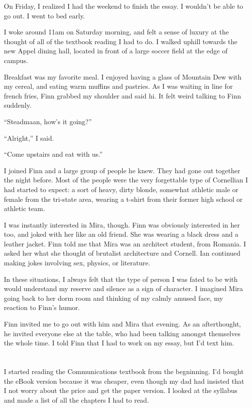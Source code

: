 On Friday, I realized I had the weekend to finish the essay.  I wouldn't be able
to go out. I went to bed early.

I woke around 11am on Saturday morning, and felt a sense of luxury at the
thought of all of the textbook reading I had to do.  I walked uphill towards the
new Appel dining hall, located in front of a large soccer field at the edge of
campus.

Breakfast was my favorite meal.  I enjoyed having a glass of Mountain Dew with
my cereal, and eating warm muffins and pastries.  As I was waiting in line for
french fries, Finn grabbed my shoulder and said hi.  It felt weird talking to
Finn suddenly.

``Steadmaan, how's it going?''

``Alright,'' I said.

``Come upstairs and eat with us.'' 

I joined Finn and a large group of people he knew.  They had gone out together
the night before.  Most of the people were the very forgettable type of
Cornellian I had started to expect: a sort of heavy, dirty blonde, somewhat
athletic male or female from the tri-state area, wearing a t-shirt from their
former high school or athletic team.

I was instantly interested in Mira, though.  Finn was obviously interested in
her too, and joked with her like an old friend.  She was wearing a black dress
and a leather jacket.  Finn told me that Mira was an architect student, from
Romania.  I asked her what she thought of brutalist architecture and Cornell.
Ian continued making jokes involving sex, physics, or literature. 

In these situations, I always felt that the type of person I was fated to be
with would understand my reserve and silence as a sign of character.  I imagined
Mira going back to her dorm room and thinking of my calmly amused face, my
reaction to Finn's humor.  

Finn invited me to go out with him and Mira that evening.  As an afterthought,
he invited everyone else at the table, who had been talking amongst themselves
the whole time.  I told Finn that I had to work on my essay, but I'd text him.

\section{}

I started reading the Communications textbook from the begninning.  I'd bought
the eBook version because it was cheaper, even though my dad had insisted that I
not worry about the price and get the paper version.  I looked at the syllabus
and made a list of all the chapters I had to read.  

